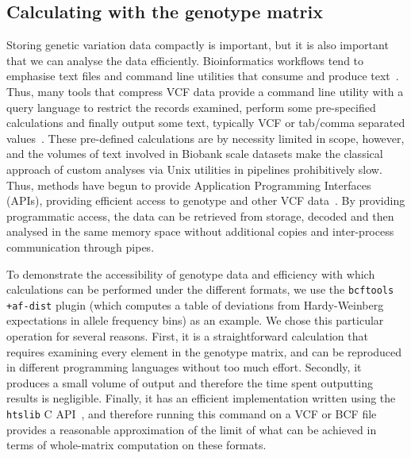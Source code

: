\documentclass[a4paper,num-refs]{oup-contemporary}
\begin{document}
\subsection{Calculating with the genotype matrix}
Storing genetic variation data compactly is important, but it is also
important that we can analyse the data efficiently. Bioinformatics 
workflows tend to emphasise text files and command line utilities 
that consume and produce text~\citep[e.g.][]{buffalo2015bioinformatics}. 
Thus, many tools that compress VCF data provide a command line 
utility with a query language to restrict the records
examined, perform some pre-specified calculations and finally 
output some text, typically VCF or tab/comma separated 
values~\citep{
layer2016efficient, %
li2016bgt, %
danek2018gtc, %
lin2020sparse, %
lan2020genozip,lan2021genozip, %
zhang2023gbc}. %
These pre-defined calculations are by necessity limited in scope, however,
and the volumes of text involved in Biobank scale datasets
make the classical approach of custom
analyses via Unix utilities in pipelines prohibitively slow. Thus, 
methods have begun to provide Application Programming Interfaces
(APIs), providing efficient access to genotype and other VCF 
data~\cite[e.g.][]{kelleher2013processing,lefaive2021sparse,
wertenbroek2022xsi}. By providing programmatic access,
the data can be retrieved from storage, decoded and then analysed
in the same memory space without additional copies and 
inter-process communication through pipes.

To demonstrate the accessibility of genotype data and efficiency with 
which calculations can be performed under the different formats,
we use the \texttt{bcftools +af-dist} plugin
(which computes a table of
deviations from Hardy-Weinberg expectations in 
allele frequency bins) as an example.
We chose this particular operation for several reasons. 
First, it is a straightforward calculation that 
requires examining every element in the genotype matrix,
and can be reproduced in different programming languages
without too much effort.
Secondly, it produces a small volume of output  and therefore the 
time spent outputting results is negligible.
Finally, it has an efficient implementation written using the 
\texttt{htslib} C API~\citep{bonfield2021htslib},
and therefore running this command on a VCF or BCF file provides 
a reasonable approximation of the limit of what can be achieved in terms 
of whole-matrix computation on these formats.
\end{document}
